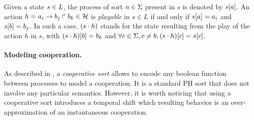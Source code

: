 \noindent
Given a state $s\in L$, the process of sort $a\in\Sigma$ present in $s$ is denoted by ${s[a]}$.
An action $h=a_i\rightarrow b_j\Rsh b_k \in \mathcal{H}$ is \emph{playable} in $s \in L$ if and only if ${s[a]}=a_i$ and ${s[b]} = b_j$.
In such a case, $(s\cdot h)$ stands for the state resulting from the play of the action $h$ in $s$, with
${(s\cdot h)[b]} = b_k$ and $\forall c \in \Sigma, c \neq b, {(s\cdot h)[c]} = {s[c]}$.

\paragraph{Modeling cooperation.}
As described in \cite{PMR10-TCSB}, a \emph{cooperative sort} allows to encode any boolean function between processes to model a cooperation.
It is a standard PH sort that does not involve any particular semantics.
However, it is worth noticing that using a cooperative sort introduces a temporal shift which resulting behavior is an over-approximation of
an instantaneous cooperation.

